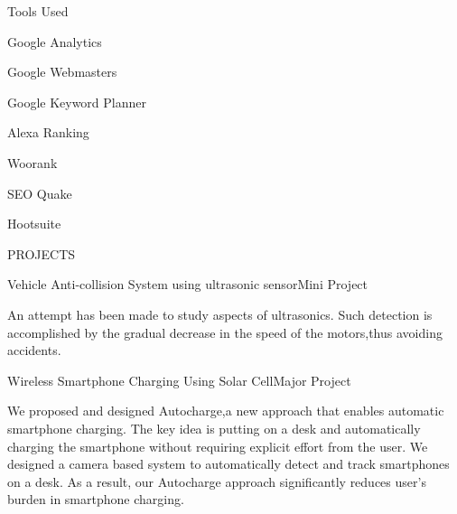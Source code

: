 \documentclass{resume} %
\begin{document}


\begin{rSection}{Tools Used}
\item Google Analytics
\item Google Webmasters
\item Google Keyword Planner
\item Alexa Ranking
\item Woorank
\item SEO Quake
\item Hootsuite



\end{rSection}


\begin{rSection}{PROJECTS}

\begin{rSubsection}{Vehicle Anti-collision System using ultrasonic sensor}{}{Mini Project}{}
\item An attempt has been made to study aspects of ultrasonics. Such detection is accomplished
by the gradual decrease in the speed of the motors,thus avoiding accidents.

 
\end{rSubsection} 



\begin{rSubsection}{Wireless Smartphone Charging Using Solar Cell}{}{Major Project}{}
\item  We proposed and designed Autocharge,a new approach that enables automatic smartphone
charging. The key idea is putting on a desk and automatically charging the smartphone without
requiring explicit effort from the user. We designed a camera based system to automatically detect and
track smartphones on a desk. As a result, our Autocharge approach significantly reduces user’s burden
in smartphone charging.

\end{rSubsection}


\end{rSection} 
\end{document}
